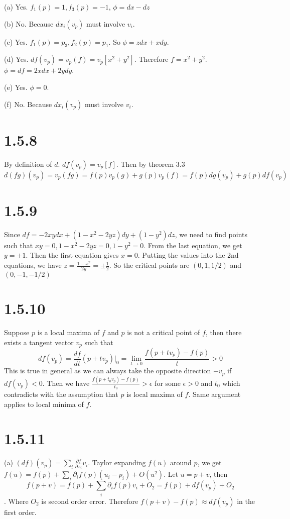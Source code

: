 \documentclass[12pt]{article}
\begin{document}
(a) Yes. $f_1(p) = 1, f_3(p) = -1$,  $\phi = dx - dz$

(b) No.  Because $dx_i(v_p)$ must involve $v_i$.

(c) Yes. $f_1(p) = p_3, f_2(p) = p_1$. So $\phi = zdx + xdy$.

(d) Yes. $df(v_p) = v_p(f) = v_p[x^2+y^2]$. Therefore $f = x^2+y^2$.  $\phi = df = 2xdx + 2ydy$.

(e) Yes. $\phi = 0$.

(f) No. Because $dx_i(v_p)$ must involve $v_i$.

\section*{1.5.8}
By definition of $d$. $df(v_p) = v_p[f]$. Then by theorem 3.3
$$ d(fg)(v_p) = v_p(fg) = f(p)v_p(g) + g(p) v_p(f) = f(p)dg(v_p) + g(p) df(v_p)$$

\section*{1.5.9}
Since $df = -2xydx + (1-x^2-2yz)dy + (1-y^2)dz$,  we need to find points such that $xy =0,  1-x^2-2yz =0, 1-y^2= 0$. From the last equation, we get $y=\pm 1$. Then the first equation gives $x=0$. Putting the values into the 2nd equations, we have $z = \frac{1-x^2}{2y} = \pm \frac{1}{2}$. So the critical points are $(0, 1, 1/2)$ and $(0, -1, -1/2)$

\section*{1.5.10}
Suppose $p$ is a local maxima of $f$ and $p$ is not a critical point of $f$, then there exists a tangent vector $v_p$ such that $$df(v_p) = \frac{df}{dt}(p+tv_p)\bigg|_0 = \lim_{t \rightarrow 0} \frac{f(p+tv_p) - f(p)}{t} > 0$$
This is true in general as we can always take the opposite direction $-v_p$ if $df(v_p) < 0$. Then we have $\frac{f(p+t_0v_p) - f(p)}{t_0} > \epsilon$ for some $\epsilon>0$ and $t_0$ which contradicts with the assumption that $p$ is local maxima of $f$. Same argument applies to local minima of $f$. \QED

\section*{1.5.11}
(a)
$(df)(v_p) = \sum_i \frac{\partial f}{\partial x_i} v_i$.  Taylor expanding $f(u)$ around $p$, we get $f(u) = f(p) + \sum_i \partial_i f (p)(u_i - p_i) + O(u^2)$. Let $u=p+v$, then $$f(p+v) = f(p) + \sum_i \partial_i f (p)v_i + O_2 = f(p) + df(v_p) + O_2$$.
Where $O_2$ is second order error. Therefore $f(p+v) - f(p) \approx df(v_p)$ in the first order. \QED
\end{document}
